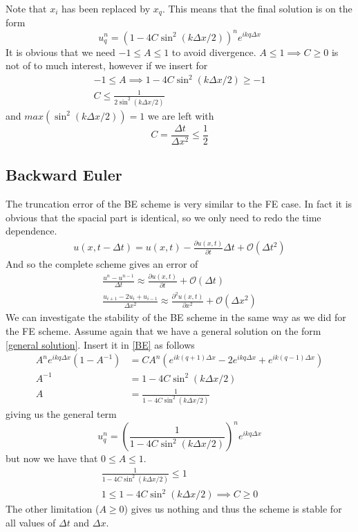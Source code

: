 \documentclass[a4paper,english, 10pt, twoside]{article}
\begin{document}
Note that $x_i$ has been replaced by $x_q$. This means that the final solution is on the form
\begin{equation*}
 u^n_q = \left(1 -4C\sin^2(k\Delta x/2)\right)^ne^{ikq\Delta x}
\end{equation*}
It is obvious that we need $-1\leq A\leq 1$ to avoid divergence. $A\leq 1 \implies C\geq 0$ is not of to much interest, however 
if we insert for 
\begin{align*}
 -1 \leq A \implies 1 -4C\sin^2(k\Delta x/2) \geq -1 \\
 C \leq \frac{1}{2\sin^2(k\Delta x/2)}
\end{align*}
and $max(\sin^2(k\Delta x/2)) = 1$ we are left with
\begin{equation}\label{stability criterion}
 C = \frac{\Delta t}{\Delta x^2} \leq \frac{1}{2}
\end{equation}

\subsection{Backward Euler}
The truncation error of the BE scheme is very similar to the FE case. In fact it is obvious that the spacial part is identical, so 
we only need to redo the time dependence.
\begin{align*}
 u(x,t-\Delta t) = u(x,t) -\frac{\partial u(x,t)}{\partial t}\Delta t + \mathcal{O}(\Delta t^2)
\end{align*}
And so the complete scheme gives an error of
\begin{align*}
  \frac{u^{n}-u^{n-1}}{\Delta t} \approx \frac{\partial u(x,t)}{\partial t} +\mathcal{O}(\Delta t)\\
 \frac{u_{i+1}-2u_i +u_{i-1}}{\Delta x^2} \approx \frac{\partial^2 u(x,t)}{\partial x^2} +\mathcal{O}(\Delta x^2)
\end{align*}
We can investigate the stability of the BE scheme in the same way as we did for the FE scheme. Assume again that we have a general 
solution on the form \ref{general solution}. Insert it in \ref{BE} as follows
\begin{align*}
 A^ne^{ikq\Delta x}(1-A^{-1}) &= CA^n\left(e^{ik(q+1)\Delta x}-2e^{ikq\Delta x} + e^{ik(q-1)\Delta x}\right)\\
 A^{-1} &= 1-4C\sin^2(k\Delta x/2)\\
 A &= \frac{1}{1-4C\sin^2(k\Delta x/2)}
\end{align*}
giving us the general term
$$
u^n_q = \left(\frac{1}{1-4C\sin^2(k\Delta x/2)}\right)^ne^{ikq\Delta x}
$$
but now we have that $0\leq A \leq 1$. 
\begin{align*}
 \frac{1}{1-4C\sin^2(k\Delta x/2)}\leq 1 \\
 1 \leq 1-4C\sin^2(k\Delta x/2) \implies C\geq 0
\end{align*}
The other limitation ($A\geq 0$) gives us nothing and thus the scheme is stable for all values of $\Delta t$ and $\Delta x$.
\end{document}
